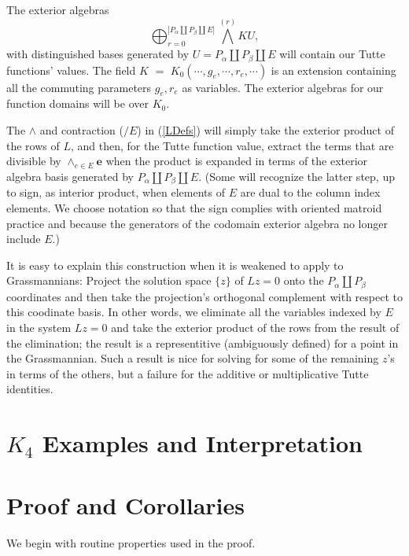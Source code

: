 \documentclass[Unicode]{cedram-alco}
\newcommand{\ext}[1]{\ensuremath{\mathbf{#1}}}
\newcommand{\dunion}{\coprod}
\begin{document}
The exterior algebras
\[
\bigoplus_{r=0}^{\left|P_\alpha \dunion P_\beta \dunion E\right|} {\bigwedge}^{(r)} KU,
\]
with distinguished bases generated by $U=P_\alpha \dunion P_\beta \dunion E$
will contain our Tutte functions' values.
The 
field $K$ $=$ $K_0( \cdots, g_e , \cdots , r_e , \cdots )$
is an extension containing 
all the commuting parameters $g_e, r_e$ as variables. The
exterior algebras for our function domains will be over $K_0$.

The $\wedge$ and contraction ($/E$) in (\ref{LDefs})
will simply take the exterior product of the rows of $L$, and
then, for the Tutte function value,
extract the terms that are divisible by $\wedge_{e \in E}\ext{e}$
when the product
is expanded in terms of the exterior algebra basis
generated by $P_\alpha \dunion P_\beta \dunion E$.
(Some will recognize the latter step, up to sign, as interior product,
when elements
of $E$ are dual to the column index elements.  We choose notation
so that the sign complies with oriented matroid practice\cite{OMBOOK} and
because the generators of the codomain exterior algebra no longer include $E$.)



It is easy to explain this construction when it is weakened
to apply to Grassmannians:
Project the solution space $\{z\}$ of $Lz=0$ onto
the $P_\alpha\dunion P_\beta$ coordinates and then take the projection's orthogonal
complement with respect to this coodinate  basis.
In other words, we eliminate all the variables
indexed by $E$ in the system $Lz=0$ and take the exterior product of the rows
from the result of the elimination; the result is a 
representitive (ambiguously defined) for a point in the Grassmannian.
Such a result is nice for solving for some of the remaining $z$'s in terms of
the others, but a failure
for the additive or multiplicative Tutte identities.


\section{$K_4$ Examples and Interpretation}







\section{Proof and Corollaries}

We begin with routine properties used in the proof.
\end{document}

